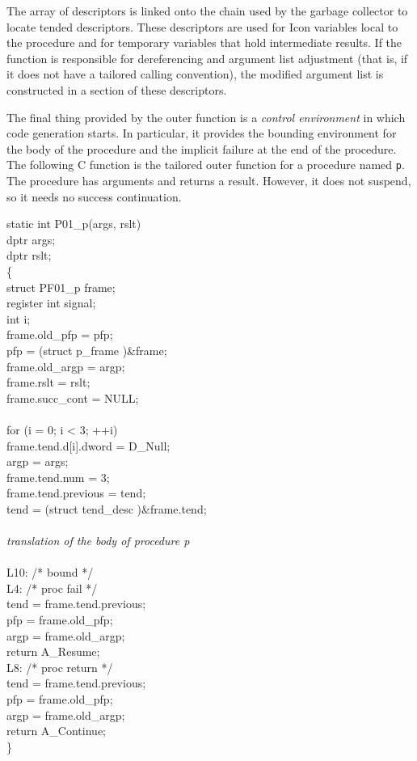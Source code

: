 The array of descriptors is linked onto the chain used by the garbage
collector to locate tended descriptors. These descriptors are used for
Icon variables local to the procedure and for temporary variables that
hold intermediate results. If the function is responsible for
dereferencing and argument list adjustment (that is, if it does not
have a tailored calling convention), the modified argument list is
constructed in a section of these descriptors.

The final thing provided by the outer function is a \textit{control
environment} in which code generation starts. In particular, it
provides the bounding environment for the body of the procedure and
the implicit failure at the end of the procedure. The following C
function is the tailored outer function for a procedure named
\texttt{p}. The procedure has arguments and returns a result. However,
it does not suspend, so it needs no success continuation.

\goodbreak
\begin{iconcode}
static int P01\_p(args, rslt)\\
dptr args;\\
dptr rslt;\\
\{\\
\>struct PF01\_p frame;\\
\>register int signal;\\
\>int i;\\
\>frame.old\_pfp = pfp;\\
\>pfp = (struct p\_frame )\&frame;\\
\>frame.old\_argp = argp;\\
\>frame.rslt = rslt;\\
\>frame.succ\_cont = NULL;\\
\\
\>for (i = 0; i < 3; ++i)\\
\>\>frame.tend.d[i].dword = D\_Null;\\
\>argp = args;\\
\>frame.tend.num = 3;\\
\>frame.tend.previous = tend;\\
\>tend = (struct tend\_desc )\&frame.tend;\\
\\
\>\textit{translation of the body of procedure p}\\
\\
L10: /* bound */\\
L4: /* proc fail */\\
\>tend = frame.tend.previous;\\
\>pfp = frame.old\_pfp;\\
\>argp = frame.old\_argp;\\
\>return A\_Resume;\\
L8: /* proc return */\\
\>tend = frame.tend.previous;\\
\>pfp = frame.old\_pfp;\\
\>argp = frame.old\_argp;\\
\>return A\_Continue;\\
\>\}\\
\end{iconcode}

